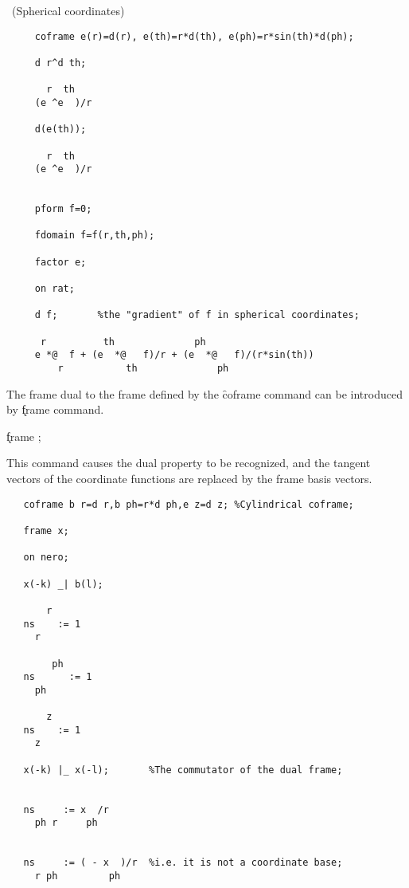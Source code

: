 \example\ (Spherical coordinates)

\begin{verbatim}
     coframe e(r)=d(r), e(th)=r*d(th), e(ph)=r*sin(th)*d(ph);

     d r^d th;

       r  th
     (e ^e  )/r

     d(e(th));

       r  th
     (e ^e  )/r


     pform f=0;

     fdomain f=f(r,th,ph);

     factor e;

     on rat;

     d f;       %the "gradient" of f in spherical coordinates;

      r          th              ph
     e *@  f + (e  *@   f)/r + (e  *@   f)/(r*sin(th))
         r           th              ph
\end{verbatim}

The frame dual to the frame defined by the \f{coframe} command can
be introduced by \k{frame} command. 
\hypertarget{command:FRAME}{}

\hspace*{2em} \k{frame} ;\label{FRAME}

This command causes the
dual property to be recognized, and the tangent vectors of the
coordinate functions are replaced by the frame basis vectors.

\example{}

\begin{verbatim}
   coframe b r=d r,b ph=r*d ph,e z=d z; %Cylindrical coframe;

   frame x;

   on nero;

   x(-k) _| b(l);

       r
   ns    := 1
     r

        ph
   ns      := 1
     ph

       z
   ns    := 1
     z

   x(-k) |_ x(-l);       %The commutator of the dual frame;


   ns     := x  /r
     ph r     ph


   ns     := ( - x  )/r  %i.e. it is not a coordinate base;
     r ph         ph

\end{verbatim}

